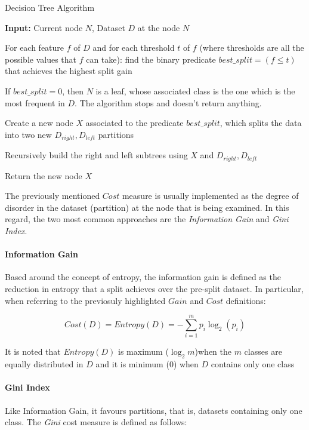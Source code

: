 \begin{breakablealgorithm}
	\caption{Decision Tree Algorithm} 
	\begin{algorithmic}[1]
		\Statex \textbf{Input:} Current node $N$, Dataset $D$ at the node $N$

        \State For each feature $f$ of $D$ and for each threshold $t$ of $f$ (where thresholds are all the possible values that $f$ can take): find the binary predicate $best\_split = (f \leq t)$ that achieves the highest split gain

        \State If $best\_split = 0$, then $N$ is a leaf, whose associated class is the one which is the most frequent in $D$. The algorithm stops and doesn't return anything.

        \State Create a new node $X$ associated to the predicate $best\_split$, which splits the data into two new $D_{right}, D_{left}$ partitions

        \State Recursively build the right and left subtrees using $X$ and $D_{right}, D_{left}$

        \State Return the new node $X$
		
		\item[] %

	\end{algorithmic}\label{alg:raptor}
\end{breakablealgorithm}

The previously mentioned $Cost$ measure is usually implemented as the degree of disorder in the dataset (partition) at the node that is being examined. In this regard, the two most common approaches are the \textit{Information Gain} and \textit{Gini Index}.

\paragraph{Information Gain} Based around the concept of entropy, the information gain is defined as the reduction in entropy that a split achieves over the pre-split dataset.
In particular, when referring to the previosuly highlighted $Gain$ and $Cost$ definitions:

$$
Cost(D) = Entropy(D) = -\sum_{i=1}^{m}{p_i \log_2{(p_i)}}
$$

It is noted that $Entropy(D)$ is maximum ($\log_2{m}$)when the $m$ classes are equally distributed in $D$ and it is minimum ($0$) when $D$ contains only one class

\paragraph{Gini Index} Like Information Gain, it favours  partitions, that is, datasets containing only one class. The \textit{Gini} cost measure is defined as follows:

